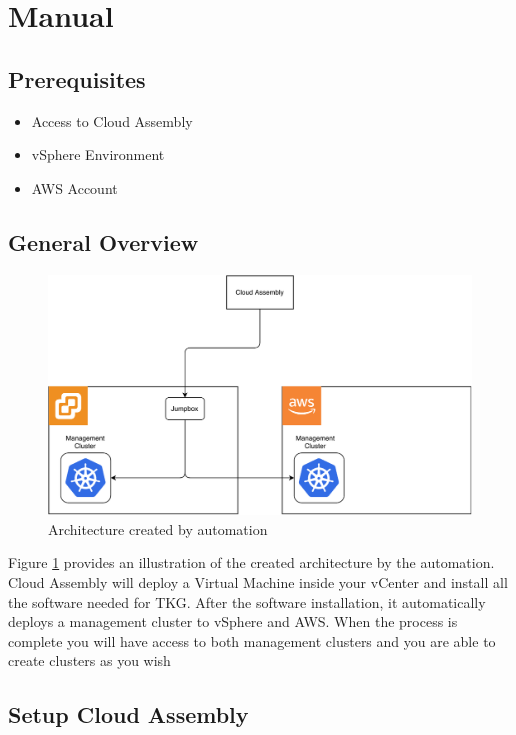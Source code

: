 \documentclass{article}
\begin{document}
\newpage

\section{Manual}
\subsection{Prerequisites}
\begin{itemize}
  \item Access to Cloud Assembly
  \item vSphere Environment 
  \item AWS Account
\end{itemize}

\subsection{General Overview}

\begin{figure}[h!]
\centering
\includegraphics[scale=0.6]{figures/overview-mc.pdf}
\caption{Architecture created by automation}
\label{fig:arch}
\end{figure}

Figure \ref{fig:arch} provides an illustration of the created architecture by the automation. Cloud Assembly will deploy a Virtual Machine inside your vCenter and install all the software needed for TKG. After the software installation, it automatically deploys a management cluster to vSphere and AWS. When the process is complete you will have access to both management clusters and you are able to create clusters as you wish 


\subsection{Setup Cloud Assembly}
\end{document}
